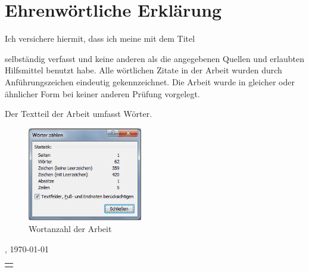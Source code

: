 \thispagestyle{empty}
\chapter*{Ehrenwörtliche Erklärung}
Ich versichere hiermit, dass ich meine \arbeitstyp{} mit
dem Titel \begin{quote}\textit{\titel}\end{quote} selbständig verfasst und keine anderen als die angegebenen Quellen und erlaubten Hilfsmittel benutzt habe. Alle wörtlichen Zitate in der Arbeit wurden durch Anführungszeichen eindeutig gekennzeichnet. Die Arbeit wurde in gleicher oder ähnlicher Form bei keiner anderen Prüfung vorgelegt. 

Der Textteil der Arbeit umfasst \wortanzahl{} Wörter. 
\begin{figure}[h]
	\centering
	\includegraphics[width=5cm, keepaspectratio]{./bilder/wortanzahl.png}
	\caption*{Wortanzahl der Arbeit}
\end{figure}

\ort, \today \\

\begin{tabular}{@{}l@{}}\hline
	\autor
\end{tabular}